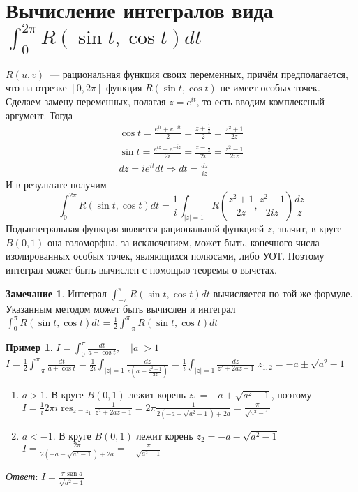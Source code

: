 \documentclass[a4paper, 12pt]{article}
\DeclareMathOperator*{\res}{res}
\DeclareMathOperator{\sgn}{sgn}
\theoremstyle{definition}
\newtheorem*{remark}{Замечание}
\theoremstyle{definition}
\newtheorem*{example}{Пример}
\begin{document}
\section{Вычисление интегралов вида $\displaystyle \int_0^{2\pi}R(\sin t, \cos t) dt$}
$R(u, v)$~--- рациональная функция своих переменных, причём предполагается, что на отрезке $[0, 2\pi]$ функция $R(\sin t, \cos t)$ не имеет особых точек. \\
Сделаем замену переменных, полагая $z = e^{it}$, то есть вводим комплексный аргумент.
Тогда 
\begin{gather*}
    \cos t = \frac{e^{it} + e^{-it}}{2} = \frac{z + \frac{1}{z}}{2} = \frac{z^2 + 1}{2z} \\
    \sin t = \frac{e^{iz} - e^{-iz}}{2i} = \frac{z - \frac{1}{z}}{2i} = \frac{z^2 - 1}{2iz} \\
    dz = ie^{it}dt \Rightarrow dt = \frac{dz}{iz}
\end{gather*}
И в результате получим
\[ \int_0^{2\pi}R (\sin t, \cos t) dt = \frac{1}{i} \int_{|z| = 1} R \left(\frac{z^2 + 1}{2z}, \frac{z^2 - 1}{2iz} \right)\frac{dz}{z} \]
Подынтегральная функция является рациональной функцией $z$, значит, в круге $B(0,1)$ она голоморфна, за исключением, может быть, конечного числа изолированных особых точек, являющихся полюсами, либо УОТ.
Поэтому интеграл может быть вычислен с помощью теоремы о вычетах.

\begin{remark}
    Интеграл $\displaystyle \int_{-\pi}^{\pi} R(\sin t, \cos t) dt$ вычисляется по той же формуле.
    Указанным методом может быть вычислен и интеграл $\displaystyle \int_0^{\pi} R(\sin t, \cos t) dt = \frac{1}{2} \int_{-\pi}^{\pi} R(\sin t, \cos t) dt$
\end{remark}

\begin{example}
    $\displaystyle I = \int_0^\pi \frac{dt}{a + \cos t}, \quad |a| > 1$ \\
    $\displaystyle I = \frac{1}{2} \int_{-\pi}^{\pi} \frac{dt}{a + \cos t} = \frac{1}{2i} \int_{|z|=1} \frac{dz}{z \left( a + \frac{z^2 + 1}{2z} \right)} = \frac{1}{i} \int_{|z|=1} \frac{dz}{z^2+2az+1}$
    $\displaystyle z_{1,2}=-a \pm \sqrt{a^2-1}$ \\
    \begin{enumerate}
        \item $a > 1$. В круге $B(0,1)$ лежит корень $z_1 = -a+\sqrt{a^2-1}$, поэтому \\
            $\displaystyle I = \frac{1}{i}2\pi i \res_{z=z_1}{\frac{1}{z^2+2az+1}} = 2 \pi \frac{1}{2\left(-a+\sqrt{a^2-1}\right) +2a} = \frac{\pi}{\sqrt{a^2-1}}$
        \item $a<-1$. В круге $B(0,1)$ лежит корень $z_2 = -a-\sqrt{a^2-1}$ \\
            $\displaystyle I = \frac{2\pi}{2\left(-a-\sqrt{a^2-1}\right) +2a} = -\frac{\pi}{\sqrt{a^2-1}}$
    \end{enumerate}
    \textit{Ответ}: $\displaystyle I = \frac{\pi \sgn a}{\sqrt{a^2-1}}$
\end{example}
\end{document}
